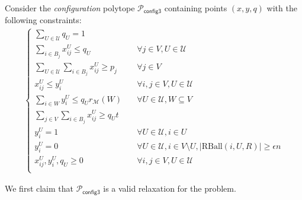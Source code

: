 \documentclass[a4paper,11pt]{article}
\newcommand{\U}{\mathcal{U}}
\newcommand{\M}{\mathcal{M}}
\renewcommand{\P}{\mathcal{P}}
\newcommand{\RBall}{\mathrm{RBall}}
\begin{document}
Consider the \emph{configuration} polytope $\P_\textsf{config3}$ containing points $(x,y,q)$ with the following constraints:
\begin{align*}
  \begin{cases}
      \sum_{U \in \U}q_U = 1     & \quad \\
      \sum_{i \in B_j} x^{U}_{ij} \leq q_U    & \quad \forall j \in V, U \in \U \\
      \sum_{U \in \U} \sum_{i \in B_j} x^{U}_{ij} \geq p_j    & \quad \forall j \in V \\
       x^{U}_{ij} \leq y^{U}_i   & \quad \forall i,j \in V, U \in \U\\
       \sum_{i \in W}  y^{U}_i \leq q_U r_\M(W)    & \quad  \forall U \in \U, W \subseteq V \\
       \sum_{j \in V} \sum_{i \in B_j} x^{U}_{ij} \geq q_U t   & \quad \\
       y^{U}_i = 1 & \quad \forall U \in \U, i \in U\\
       y^{U}_i = 0 & \quad \forall U \in \U, i \in V \setminus U, |\RBall(i, U, R)| \geq \epsilon n \\
       x^{U}_{ij}, y^{U}_i, q_U \geq 0   & \quad \forall i,j \in V, U \in \U \\
  \end{cases}
\end{align*}

We first claim that $\P_\textsf{config3}$ is a valid relaxation for the problem.
\end{document}
